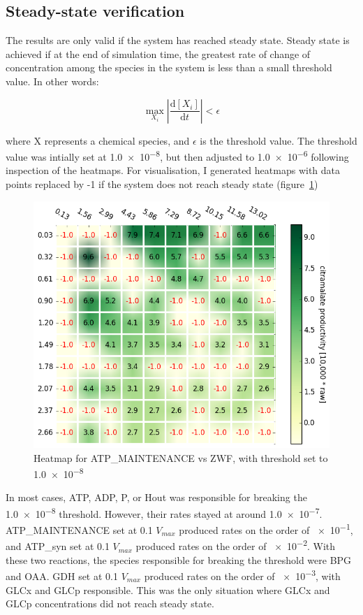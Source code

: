 \documentclass[parskip=full, numbers=noenddot]{scrreprt}
\begin{document}
\subsection{Steady-state verification}
\label{ssec:steadystate}

The results are only valid if the system has reached steady state. Steady state is achieved if at the end of simulation time, the greatest rate of change of concentration among the species in the system is less than a small threshold value. In other words:

\[
  \max_{X_{i}} \left | \frac{\mathrm{d}[X_{i}]}{\mathrm{d}t} \right | < \epsilon
\]

where X represents a chemical species, and $\epsilon$ is the threshold value. The threshold value was intially set at \num{1.0e-8}, but then adjusted to \num{1.0e-6} following inspection of the heatmaps. For  visualisation, I generated heatmaps with data points replaced by -1 if the system does not reach steady state (figure~\ref{fig:steadystate})

\begin{figure}[htbp]
  \centering
  \includegraphics[scale=0.5]{steadystate}
  \caption{Heatmap for ATP\_MAINTENANCE vs ZWF, with threshold set to \num{1.0e-8}}
  \label{fig:steadystate}
\end{figure}

In most cases, ATP, ADP, P, or Hout was responsible for breaking the \num{1.0e-8} threshold. However, their rates stayed at around \num{1.0e-7}. ATP\_MAINTENANCE set at 0.1 $V_{max}$ produced rates on the order of \num{e-1}, and ATP\_syn set at 0.1 $V_{max}$ produced rates on the order of \num{e-2}. With these two reactions, the species responsible for breaking the threshold were BPG and OAA. GDH set at 0.1 $V_{max}$ produced rates on the order of \num{e-3}, with GLCx and GLCp responsible. This was the only situation where GLCx and GLCp concentrations did not reach steady state.
\end{document}
